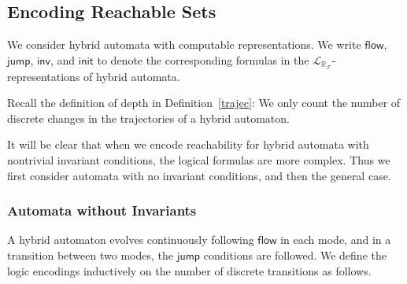 \documentclass[envcountsect]{llncs}
\newcommand{\flow}{\mathsf{flow}}
\newcommand{\jump}{\mathsf{jump}}
\newcommand{\inv}{\mathsf{inv}}
\newcommand{\init}{\mathsf{init}}
\newcommand{\lrf}{\mathcal{L}_{\mathbb{R}_{\mathcal{F}}}}
\begin{document}
\subsection{Encoding Reachable Sets}

We consider hybrid automata with computable representations. We write $\flow$, $\jump$, $\inv$, and $\init$ to denote the corresponding formulas in the $\lrf$-representations of hybrid automata. 

\begin{remark}
Recall the definition of depth in Definition~\ref{trajec}: We only count the number of discrete changes in the trajectories of a hybrid automaton. 
\end{remark}

It will be clear that when we encode reachability for hybrid automata with nontrivial invariant conditions, the logical formulas are more complex. Thus we first consider automata with no invariant conditions, and then the general case. 


\subsubsection{Automata without Invariants}

A hybrid automaton evolves continuously following $\flow$ in each mode, and in a transition between two modes, the $\jump$ conditions are followed. We define the logic encodings inductively on the number of discrete transitions as follows. 
\end{document}

